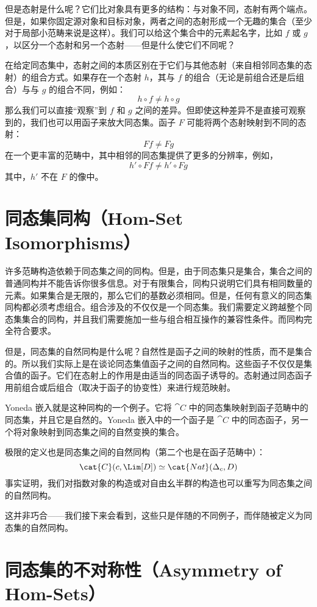 但是态射是什么呢？它们比对象具有更多的结构：与对象不同，态射有两个端点。但是，如果你固定源对象和目标对象，两者之间的态射形成一个无趣的集合（至少对于局部小范畴来说是这样）。我们可以给这个集合中的元素起名字，比如 $f$ 或 $g$，以区分一个态射和另一个态射——但是什么使它们不同呢？

在给定同态集中，态射之间的本质区别在于它们与其他态射（来自相邻同态集的态射）的组合方式。如果存在一个态射 $h$，其与 $f$ 的组合（无论是前组合还是后组合）与与 $g$ 的组合不同，例如：
\[h \circ f \neq h \circ g\]
那么我们可以直接“观察”到 $f$ 和 $g$ 之间的差异。但即使这种差异不是直接可观察到的，我们也可以用函子来放大同态集。函子 $F$ 可能将两个态射映射到不同的态射：
\[F f \neq F g\]
在一个更丰富的范畴中，其中相邻的同态集提供了更多的分辨率，例如，
\[h' \circ F f \neq h' \circ F g\]
其中，$h'$ 不在 $F$ 的像中。

\section{同态集同构（Hom-Set Isomorphisms）}

许多范畴构造依赖于同态集之间的同构。但是，由于同态集只是集合，集合之间的普通同构并不能告诉你很多信息。对于有限集合，同构只说明它们具有相同数量的元素。如果集合是无限的，那么它们的基数必须相同。但是，任何有意义的同态集同构都必须考虑组合。组合涉及的不仅仅是一个同态集。我们需要定义跨越整个同态集集合的同构，并且我们需要施加一些与组合相互操作的兼容性条件。而同构完全符合要求。

但是，同态集的自然同构是什么呢？自然性是函子之间的映射的性质，而不是集合的。所以我们实际上是在谈论同态集值函子之间的自然同构。这些函子不仅仅是集合值的函子。它们在态射上的作用是由适当的同态函子诱导的。态射通过同态函子用前组合或后组合（取决于函子的协变性）来进行规范映射。

Yoneda 嵌入就是这种同构的一个例子。它将 $\cat{C}$ 中的同态集映射到函子范畴中的同态集，并且它是自然的。Yoneda 嵌入中的一个函子是 $\cat{C}$ 中的同态函子，另一个将对象映射到同态集之间的自然变换的集合。

极限的定义也是同态集之间的自然同构（第二个也是在函子范畴中）：
\[\cat{C}(c, \Lim[D]) \simeq \cat{Nat}(\Delta_c, D)\]
事实证明，我们对指数对象的构造或对自由幺半群的构造也可以重写为同态集之间的自然同构。

这并非巧合——我们接下来会看到，这些只是伴随的不同例子，而伴随被定义为同态集的自然同构。

\section{同态集的不对称性（Asymmetry of Hom-Sets）}

